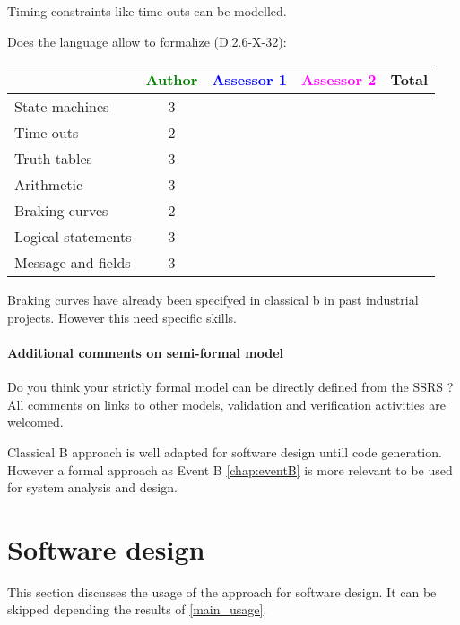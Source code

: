 \begin{author_comment}
Timing constraints like time-outs can be modelled.
\end{author_comment}


Does the language allow to  formalize (D.2.6-X-32):

\begin{tabular}{|l | c | c | c | c|}
\hline
& \textcolor{green}{Author} & \textcolor{blue}{Assessor 1} & \textcolor{magenta}{Assessor 2} & Total \\
\hline 
State machines  & 3 & & &  \\
\hline
Time-outs  & 2 & & &  \\
\hline
Truth tables  & 3 & & &  \\
\hline
Arithmetic  & 3 & & &  \\
\hline
Braking curves  & 2 & & &  \\
\hline
Logical statements & 3 & & &  \\
\hline
Message and fields & 3 & & &  \\
\hline
\end{tabular}


\begin{author_comment}
Braking curves have already been specifyed in classical b  in past industrial projects. However this need specific skills.
\end{author_comment}


\paragraph{Additional comments on semi-formal  model} Do you think your strictly formal  model can be directly defined from the SSRS ?
All comments on links to  other models, validation and verification activities are welcomed.



\begin{author_comment}
Classical B  approach is well adapted for software design untill code generation. However a formal approach as Event B \ref{chap:eventB} is more relevant to be used for system analysis and design.
\end{author_comment}


\section{Software design}
This section discusses the usage of the approach for software design.
It can be skipped depending the results of \ref{main_usage}.

